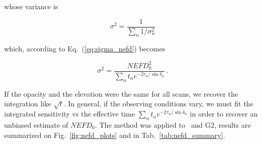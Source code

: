 whose variance is

\begin{equation}
\sigma^2 = \frac{1}{\sum_n 1/\sigma_n^2}
\end{equation}

which, according to Eq.~(\ref{eq:sigma_nefd}) becomes

\begin{equation}
\sigma^2 = \frac{NEFD_0^2}{\sum_{n}t_n e^{-2\tau_n/\sin\delta_n}}\,.
\label{eq:sigma_tau_w8}
\end{equation}

If the opacity and the elevation were the same for all scans, we recover the
integration like $\sqrt{t}$. In general, if the observing conditions vary, we
must fit the integrated sensitivity vs the effective time $\sum_{n}t_n
e^{-2\tau_n/\sin\delta_n}$ in order to recover an unbiased estimate of
$NEFD_0$. The method was applied to \hls\ and G2, results are summarized on
Fig.~\ref{fig:nefd_plots} and in Tab.~\ref{tab:nefd_summary}.

